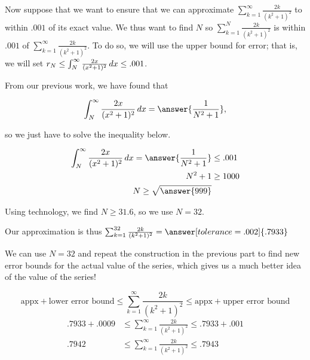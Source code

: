 \documentclass{ximera}
\begin{document}
\begin{exercise}
\begin{exercise}
\begin{exercise}
\begin{exercise}
Now suppose that we want to ensure that we can approximate $\sum_{k=1}^{\infty} \frac{2k}{(k^2+1)^2}$ to within $.001$ of its exact value.  We thus want to find $N$ so $\sum_{k=1}^{N} \frac{2k}{(k^2+1)^2}$ is within $.001$ of $\sum_{k=1}^{\infty} \frac{2k}{(k^2+1)^2}$.  To do so, we will use the upper bound for error; that is, we will set $r_N \leq \int_N^\infty \frac{2x}{(x^2+1)^2} \mathop{}\!d x \leq .001$.

From our previous work, we have found that

\[
 \int_N^\infty \frac{2x}{(x^2+1)^2} \d x= \answer{\frac{1}{N^2+1}},
\]

so we just have to solve the inequality below.

\begin{align*}
 \int_N^\infty \frac{2x}{(x^2+1)^2} \d x =  \answer{\frac{1}{N^2+1}} &\leq .001 \\
N^2+1 &\geq 1000 \\
N \geq \sqrt{\answer{999}}
\end{align*}

Using technology, we find $N \geq 31.6$, so we use $N=32$.

Our approximation is thus $\sum_{k=1}^{32} \frac{2k}{(k^2+1)^2} = \answer[tolerance=.002]{.7933}$


\begin{remark}
We can use $N=32$ and repeat the construction in the previous part to find new error bounds for the actual value of the series, which gives us a much better idea of the value of the series!

\[
\textrm{appx} + \textrm{lower error bound}  \leq \sum_{k=1}^{\infty} \frac{2k}{(k^2+1)^2}  \leq \textrm{appx} + \textrm{upper error bound} 
\]
\begin{align*}
.7933 +.0009 &\leq \sum_{k=1}^{\infty} \frac{2k}{(k^2+1)^2} \leq .7933 +.001 \\
.7942 &\leq  \sum_{k=1}^{\infty} \frac{2k}{(k^2+1)^2} \leq .7943 
\end{align*}

\end{remark}

\end{exercise}
\end{exercise}








\end{exercise}
\end{exercise}
\end{document}
